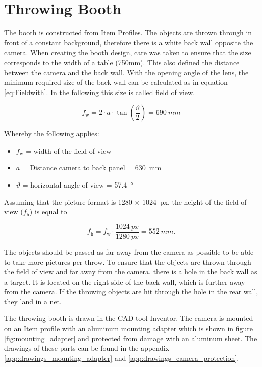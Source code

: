 \section{Throwing Booth}
\label{sec:booth}
The booth is constructed from Item Profiles.
The objects are thrown through in front of a constant background, therefore there is a white back wall opposite the camera.
When creating the booth design, care was taken to ensure that the size corresponds to the width of a table (750mm).
This also defined the distance between the camera and the back wall.
With the opening angle of the lens, the minimum required size of the back wall can be calculated as in equation \ref{eq:Fieldwith}. 
In the following this size is called field of view.

\begin{equation}
	f_\text{w} = 2 \cdot a \cdot \tan\left( \frac{\vartheta}{2}\right) = \SI{690}{mm}
	\label{eq:Fieldwith}
\end{equation}

Whereby the following applies:
\begin{itemize}
	\item $f_\text{w}$ = width of the field of view
	\item $a$ = Distance camera to back panel = \SI{630}{mm}
	\item $\vartheta$ = horizontal angle of view = \SI{57.4}{\degree} \cite{BaumerLense}
\end{itemize}

Assuming that the picture format is 1280 $\times$ \SI{1024}{px}, the height of the field of view ($f_\text{h}$) is equal to

\begin{equation}
	f_\text{h} = f_\text{w} \cdot \frac{\SI{1024}{px}}{\SI{1280}{px}} = \SI{552}{mm}.
	\label{eq:Fieldhight}
\end{equation}

The objects should be passed as far away from the camera as possible to be able to take more pictures per throw.
To ensure that the objects are thrown through the field of view and far away from the camera, there is a hole in the back wall as a target.
It is located on the right side of the back wall, which is further away from the camera.
If the throwing objects are hit through the hole in the rear wall, they land in a net.

The throwing booth is drawn in the CAD tool Inventor.
The camera is mounted on an Item profile with an aluminum mounting adapter which is shown in figure \ref{fig:mounting_adapter} and protected from damage with an aluminum sheet.
The drawings of these parts can be found in the appendix \ref{app:drawings_mounting_adapter} and \ref{app:drawings_camera_protection}.

